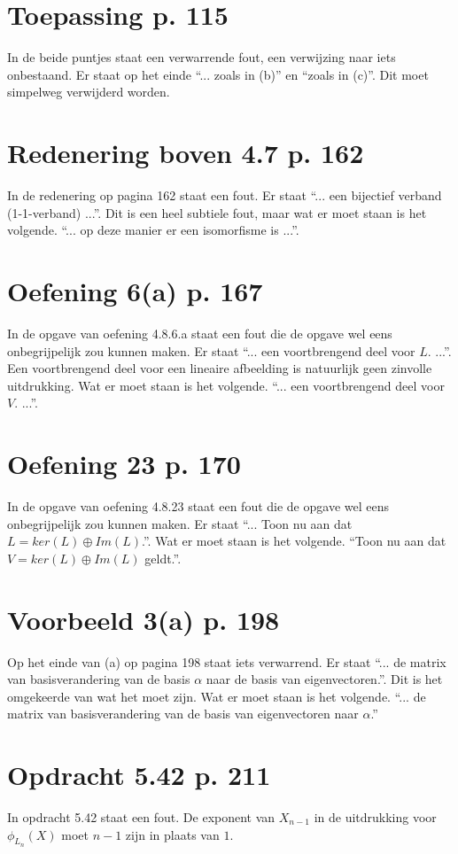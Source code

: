 \documentclass[lineaire_algebra_oplossingen.tex]{subfiles}
\begin{document}
\section{Toepassing p. 115}
In de beide puntjes staat een verwarrende fout, een verwijzing naar iets onbestaand.
Er staat op het einde ``... zoals in (b)'' en ``zoals in (c)''.
Dit moet simpelweg verwijderd worden.

\section{Redenering boven 4.7 p. 162}
In de redenering op pagina 162 staat een fout. Er staat ``... een bijectief verband (1-1-verband) ...''.
Dit is een heel subtiele fout, maar wat er moet staan is het volgende. ``... op deze manier er een isomorfisme is ...''. 

\section{Oefening 6(a) p. 167}
In de opgave van oefening 4.8.6.a staat een fout die de opgave wel eens onbegrijpelijk zou kunnen maken.
Er staat ``... een voortbrengend deel voor $L$. ...''.
Een voortbrengend deel voor een lineaire afbeelding is natuurlijk geen zinvolle uitdrukking.
Wat er moet staan is het volgende. ``... een voortbrengend deel voor $V$. ...''.

\section{Oefening 23 p. 170}
In de opgave van oefening 4.8.23 staat een fout die de opgave wel eens onbegrijpelijk zou kunnen maken.
Er staat ``... Toon nu aan dat $L = ker(L) \oplus Im(L)$.''.
Wat er moet staan is het volgende.
``Toon nu aan dat $V = ker(L) \oplus Im(L)$ geldt.''.

\section{Voorbeeld 3(a) p. 198}
Op het einde van (a) op pagina 198 staat iets verwarrend.
Er staat ``... de matrix van basisverandering van de basis $\alpha$ naar de basis van eigenvectoren.''.
Dit is het omgekeerde van wat het moet zijn.
Wat er moet staan is het volgende.
``... de matrix van basisverandering van de basis van eigenvectoren naar $\alpha$.''

\section{Opdracht 5.42 p. 211}
In opdracht 5.42 staat een fout. De exponent van $X_{n-1}$ in de uitdrukking voor $\phi_{L_{n}}(X)$ moet $n-1$ zijn in plaats van $1$.
\end{document}
